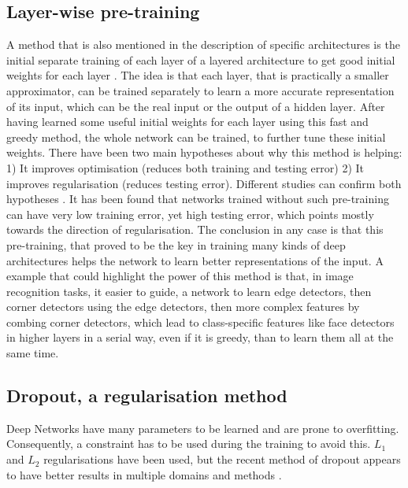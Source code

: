 \documentclass[a4paper]{article}
\begin{document}
	\subsection{Layer-wise pre-training}
	\label{par:Pre-training}
		A method that is also mentioned in the description of specific architectures is the initial separate training of each layer of a layered architecture to get good initial weights for each layer \cite{Hinton2006a,Bengio2007a}. The idea is that each layer, that is practically a smaller approximator, can be trained separately to learn a more accurate representation of its input, which can be the real input or the output of a hidden layer. After having learned some useful initial weights for each layer using this fast and greedy method, the whole network can be trained, to further tune these initial weights. 
		There have been two main hypotheses about why this method is helping: 1) It improves optimisation (reduces both training and testing error) 2) It improves regularisation (reduces testing error). Different studies can confirm both hypotheses \cite{Bengio2009}. It has been found that networks trained without such pre-training can have very low training error, yet high testing error, which points mostly towards the direction of regularisation. The conclusion in any case is that this pre-training, that proved to be the key in training many kinds of deep architectures helps the network to learn better representations of the input. A example that could highlight the power of this method is that, in image recognition tasks, it easier to guide, a network to learn edge detectors, then corner detectors using the edge detectors, then more complex features by combing corner detectors, which lead to class-specific features like face detectors in higher layers in a serial way, even if it is greedy, than to learn them all at the same time.
	
	\subsection{Dropout, a regularisation method}
	\label{par:Dropout}
		Deep Networks have many parameters to be learned and are prone to overfitting. Consequently, a constraint has to be used during the training to avoid this. $L_1$ and $ L_2$ regularisations have been used, but the recent method of dropout appears to have better results in multiple domains and methods \cite{Srivastava2014}.
		
\end{document}
